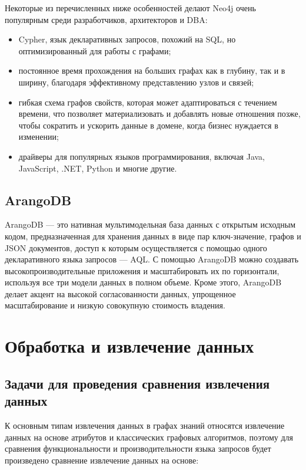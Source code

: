 Некоторые из перечисленных ниже особенностей делают Neo4j очень популярным среди разработчиков, архитекторов и DBA:

\begin{itemize}
    \item Cypher, язык декларативных запросов, похожий на SQL, но оптимизированный для работы с графами;
    \item постоянное время прохождения на больших графах как в глубину, так и в ширину, благодаря эффективному представлению узлов и связей;
    \item гибкая схема графов свойств, которая может адаптироваться с течением времени, что позволяет материализовать и добавлять новые отношения позже, чтобы сократить и ускорить данные в домене, когда бизнес нуждается в изменении;
    \item драйверы для популярных языков программирования, включая Java, JavaScript, .NET, Python и многие другие.
\end{itemize}

\subsection{ArangoDB}

ArangoDB — это нативная мультимодельная база данных с открытым исходным кодом, предназначенная для хранения данных в виде пар ключ-значение,
графов и JSON документов, доступ к которым осуществляется с помощью одного декларативного языка запросов — AQL. С помощью ArangoDB можно
создавать высокопроизводительные приложения и масштабировать их по горизонтали, используя все три модели данных в полном объеме.
Кроме этого, ArangoDB делает акцент на высокой согласованности данных, упрощенное масштабирование и низкую совокупную стоимость владения.


\section{Обработка и извлечение данных}

\subsection{Задачи для проведения сравнения извлечения данных}

К основным типам извлечения данных в графах знаний относятся извлечение данных на основе атрибутов и классических графовых алгоритмов,
поэтому для сравнения функциональности и производительности языка запросов будет произведено сравнение извлечение данных на основе:


